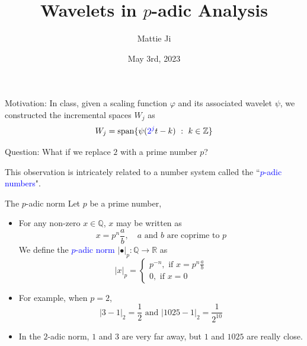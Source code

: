 \documentclass[hyperref, notheorems]{beamer}
\title{Wavelets in $p$-adic Analysis}
\author{Mattie Ji}
\institute{APMA 1940Y - Wavelets and Applications}
\date{May 3rd, 2023}
\DeclareMathOperator{\spn}{\mathrm{span}}
\newcommand{\Rbb}{\mathbb{R}}
\newcommand{\Zbb}{\mathbb{Z}}
\newcommand{\Qbb}{\mathbb{Q}}
\newcommand{\txtblue}{\textcolor{blue}}
\theoremstyle{definition}
\begin{document}
\begin{frame}
    \titlepage
\end{frame}



\begin{frame}{Motivation:}
In class, given a scaling function $\varphi$ and its associated wavelet $\psi$, we constructed the incremental spaces $W_j$ as
\[W_j = \spn \{\psi(\txtblue{2^j} t - k)\ :\ k \in \Zbb\}\]

\begin{block}{Question:}
    What if we replace $2$ with a prime number $p$?
\end{block}

This observation is intricately related to a number system called the ``\txtblue{$p$-adic numbers}".
\end{frame}



\begin{frame}{The $p$-adic norm}
Let $p$ be a prime number,
\begin{itemize}
    \item For any non-zero $x \in \Qbb$, $x$ may be written as
    \[x = p^n \frac{a}{b},\quad \text{$a$ and $b$ are coprime to $p$}\]
    We define the \txtblue{$p$-adic norm} $|\bullet|_p: \Qbb \to \Rbb$ as
    \[|x|_p = \begin{cases}
    p^{-n}, \text{ if $x = p^n \frac{a}{b}$}\\
    0, \text{ if $x = 0$}
    \end{cases}\]
    \item For example, when $p = 2$,
    \[|3 - 1|_2 = \frac{1}{2} \text{ and } |1025 - 1|_2 = \frac{1}{2^{10}}\]
    \item In the $2$-adic norm, $1$ and $3$ are very far away, but $1$ and $1025$ are really close.
\end{itemize}
\end{frame}
\end{document}
